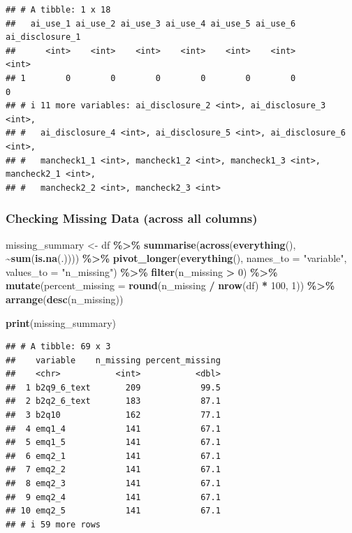 \documentclass[
]{article}
\newenvironment{Shaded}{\begin{snugshade}}{\end{snugshade}}
\newcommand{\AttributeTok}[1]{\textcolor[rgb]{0.13,0.29,0.53}{#1}}
\newcommand{\DecValTok}[1]{\textcolor[rgb]{0.00,0.00,0.81}{#1}}
\newcommand{\FunctionTok}[1]{\textcolor[rgb]{0.13,0.29,0.53}{\textbf{#1}}}
\newcommand{\NormalTok}[1]{#1}
\newcommand{\OtherTok}[1]{\textcolor[rgb]{0.56,0.35,0.01}{#1}}
\newcommand{\SpecialCharTok}[1]{\textcolor[rgb]{0.81,0.36,0.00}{\textbf{#1}}}
\newcommand{\StringTok}[1]{\textcolor[rgb]{0.31,0.60,0.02}{#1}}
\begin{document}
\begin{verbatim}
## # A tibble: 1 x 18
##   ai_use_1 ai_use_2 ai_use_3 ai_use_4 ai_use_5 ai_use_6 ai_disclosure_1
##      <int>    <int>    <int>    <int>    <int>    <int>           <int>
## 1        0        0        0        0        0        0               0
## # i 11 more variables: ai_disclosure_2 <int>, ai_disclosure_3 <int>,
## #   ai_disclosure_4 <int>, ai_disclosure_5 <int>, ai_disclosure_6 <int>,
## #   mancheck1_1 <int>, mancheck1_2 <int>, mancheck1_3 <int>, mancheck2_1 <int>,
## #   mancheck2_2 <int>, mancheck2_3 <int>
\end{verbatim}

\subsubsection{Checking Missing Data (across all
columns)}\label{checking-missing-data-across-all-columns}

\begin{Shaded}
\begin{Highlighting}[]
\NormalTok{missing\_summary }\OtherTok{\textless{}{-}}\NormalTok{ df }\SpecialCharTok{\%\textgreater{}\%}
  \FunctionTok{summarise}\NormalTok{(}\FunctionTok{across}\NormalTok{(}\FunctionTok{everything}\NormalTok{(), }\SpecialCharTok{\textasciitilde{}}\FunctionTok{sum}\NormalTok{(}\FunctionTok{is.na}\NormalTok{(.)))) }\SpecialCharTok{\%\textgreater{}\%}
  \FunctionTok{pivot\_longer}\NormalTok{(}\FunctionTok{everything}\NormalTok{(), }\AttributeTok{names\_to =} \StringTok{"variable"}\NormalTok{, }\AttributeTok{values\_to =} \StringTok{"n\_missing"}\NormalTok{) }\SpecialCharTok{\%\textgreater{}\%}
  \FunctionTok{filter}\NormalTok{(n\_missing }\SpecialCharTok{\textgreater{}} \DecValTok{0}\NormalTok{) }\SpecialCharTok{\%\textgreater{}\%}
  \FunctionTok{mutate}\NormalTok{(}\AttributeTok{percent\_missing =} \FunctionTok{round}\NormalTok{(n\_missing }\SpecialCharTok{/} \FunctionTok{nrow}\NormalTok{(df) }\SpecialCharTok{*} \DecValTok{100}\NormalTok{, }\DecValTok{1}\NormalTok{)) }\SpecialCharTok{\%\textgreater{}\%}
  \FunctionTok{arrange}\NormalTok{(}\FunctionTok{desc}\NormalTok{(n\_missing))}

\FunctionTok{print}\NormalTok{(missing\_summary)}
\end{Highlighting}
\end{Shaded}

\begin{verbatim}
## # A tibble: 69 x 3
##    variable    n_missing percent_missing
##    <chr>           <int>           <dbl>
##  1 b2q9_6_text       209            99.5
##  2 b2q2_6_text       183            87.1
##  3 b2q10             162            77.1
##  4 emq1_4            141            67.1
##  5 emq1_5            141            67.1
##  6 emq2_1            141            67.1
##  7 emq2_2            141            67.1
##  8 emq2_3            141            67.1
##  9 emq2_4            141            67.1
## 10 emq2_5            141            67.1
## # i 59 more rows
\end{verbatim}
\end{document}
